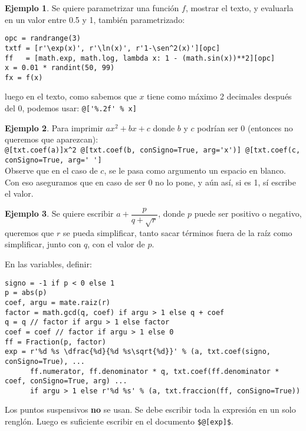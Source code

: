 \documentclass[12pt]{article}
\theoremstyle{definition}
\newtheorem{ejem}{Ejemplo}
\begin{document}
\begin{ejem}
  Se quiere parametrizar una funci\'on $f$, mostrar el texto, y evaluarla en un valor entre 0.5 y 1, tambi\'en parametrizado:
\begin{verbatim}
opc = randrange(3)
txtf = [r'\exp(x)', r'\ln(x)', r'1-\sen^2(x)'][opc]
ff   = [math.exp, math.log, lambda x: 1 - (math.sin(x))**2][opc]
x = 0.01 * randint(50, 99)
fx = f(x)
\end{verbatim}
luego en el texto, como sabemos que $x$ tiene como m\'aximo 2 decimales despu\'es del 0, podemos usar:
\verb|@['%.2f' % x]|
\end{ejem}

\begin{ejem}
  Para imprimir $ax^2+bx+c$ donde $b$ y $c$ podr\'ian ser 0 (entonces no queremos que aparezcan): \\
  \small
  \verb|@[txt.coef(a)]x^2 @[txt.coef(b, conSigno=True, arg='x')] @[txt.coef(c, conSigno=True, arg=' ']| \\
  \normalsize
  Observe que en el caso de $c$, se le pasa como argumento un espacio en blanco. Con eso aseguramos que en caso de ser 0 no lo pone, y a\'un as\'i, si es 1, s\'i escribe el valor.
\end{ejem}

\begin{ejem}
  Se quiere escribir $a + \dfrac{p}{q + \sqrt{r}}$, donde $p$ puede ser positivo o negativo, queremos que $r$ se pueda simplificar, tanto sacar t\'erminos fuera de la ra\'iz como simplificar, junto con $q$, con el valor de $p$.

  En las variables, definir:
\small
\begin{verbatim}
signo = -1 if p < 0 else 1
p = abs(p)
coef, argu = mate.raiz(r)
factor = math.gcd(q, coef) if argu > 1 else q + coef
q = q // factor if argu > 1 else factor
coef = coef // factor if argu > 1 else 0
ff = Fraction(p, factor)
exp = r'%d %s \dfrac{%d}{%d %s\sqrt{%d}}' % (a, txt.coef(signo, conSigno=True), ...
      ff.numerator, ff.denominator * q, txt.coef(ff.denominator * coef, conSigno=True, arg) ...
      if argu > 1 else r'%d %s' % (a, txt.fraccion(ff, conSigno=True))
\end{verbatim}
\normalsize
\end{ejem}
Los puntos suspensivos \textbf{no} se usan. Se debe escribir toda la expresi\'on en un solo rengl\'on. Luego es suficiente escribir en el documento \verb|$@[exp]$|.
\end{document}
